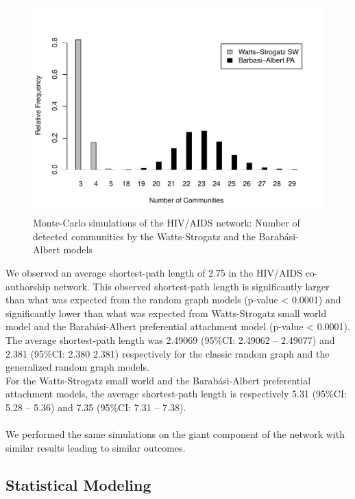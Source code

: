 \begin{figure}[h!]
\centering
\includegraphics[scale=0.65]{Chapters/hiv/mechanisticComm}
\caption{Monte-Carlo simulations of the HIV/AIDS network: Number of detected communities by the Watts-Strogatz and the Barab\'asi-Albert models}
\label{hiv_fig4}
\end{figure}

We observed an average shortest-path length of 2.75 in the HIV/AIDS co-authorship network. This observed shortest-path length is significantly larger than what was expected from the random graph models (p-value < 0.0001) and significantly lower than what was expected from Watts-Strogatz small world model and the Barab\'asi-Albert preferential attachment model (p-value < 0.0001).\\The average shortest-path length was 2.49069 (95\%CI: 2.49062 -- 2.49077) and 2.381 (95\%CI: 2.380 2.381) respectively for the classic random graph and the generalized random graph models.\\For the Watts-Strogatz small world and the Barab\'asi-Albert preferential attachment models, the average shortest-path length is respectively 5.31 (95\%CI: 5.28 -- 5.36) and 7.35 (95\%CI: 7.31 -- 7.38).\\~\\
We performed the same simulations on the giant component of the network with similar results leading to similar outcomes.
\pagebreak
\subsection{Statistical Modeling}

